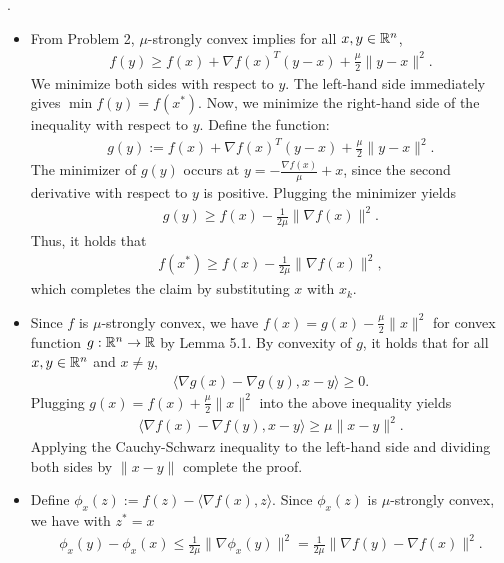 \documentclass{ExerciseSheet}
\begin{document}
\begin{solution} . 

\begin{itemize}
    \item From Problem 2, $\mu$-strongly convex implies for all $x,y\in\mathbb{R}^n$,
    \begin{align*}
        f(y) \geq f(x) + \nabla f(x)^T(y-x)+\frac{\mu}{2}\lVert y-x\rVert^2.
    \end{align*}
    We minimize both sides with respect to $y$. The left-hand side immediately gives $\min f(y) = f(x^*)$. Now, we minimize the right-hand side of the inequality with respect to $y$. Define the function:
    \begin{align*}
        g(y):= f(x) + \nabla f(x)^T(y-x)+\frac{\mu}{2}\lVert y-x\rVert^2.
    \end{align*}
    The minimizer of $g(y)$ occurs at $y=- \frac{\nabla f(x)}{\mu}+x$, since the second derivative with respect to $y$ is positive. Plugging the minimizer yields
    \begin{align*}
        g(y) \geq f(x) - \frac{1}{2\mu}\lVert \nabla f(x)\rVert^2.
    \end{align*}
    Thus, it holds that 
    \begin{align*}
        f(x^*) \geq f(x) - \frac{1}{2\mu}\lVert \nabla f(x)\rVert^2,
    \end{align*}
    which completes the claim by substituting $x$ with $x_k$.
    \item Since $f$ is $\mu$-strongly convex, we have $f(x)=g(x)-\frac{\mu}{2}\lVert x\rVert^2$ for convex function $g:\mathbb{R}^n \rightarrow \mathbb{R}$ by Lemma 5.1. By convexity of $g$, it holds that for all $x,y\in\mathbb{R}^n$ and $x\not= y$,
    \begin{align*}
        \langle \nabla g(x) - \nabla g(y),x-y\rangle \geq 0.
    \end{align*}
    Plugging $g(x)=f(x)+\frac{\mu}{2}\lVert x\rVert^2$ into the above inequality yields 
    \begin{align} \label{eq: midstep}
        \langle \nabla f(x) - \nabla f(y),x-y\rangle   \geq \mu \lVert x-y\rVert^2.
    \end{align}
    Applying the Cauchy-Schwarz inequality to the left-hand side and dividing both sides by $\lVert x-y\rVert$ complete the proof.
    \item Define $\phi_x(z):=f(z)-\langle \nabla f(x),z\rangle$. Since $\phi_x(z)$ is $\mu$-strongly convex, we have with $z^*=x$
    \begin{align*}
        \phi_x(y) - \phi_x(x) \leq \frac{1}{2\mu}\lVert \nabla \phi_x(y)\rVert^2 = \frac{1}{2\mu}\lVert \nabla f(y)-\nabla f(x)\rVert^2.

\end{align*}
\end{itemize}
\end{solution}
\end{document}
